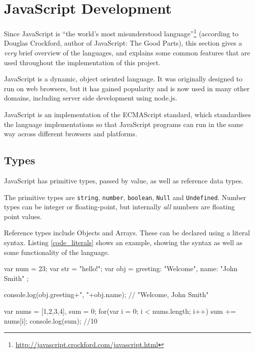 \section{JavaScript Development} %
\label{sec:javascript_development}
Since JavaScript is ``the world's most misunderstood language''\footnote{\url{http://javascript.crockford.com/javascript.html}} (according to Douglas Crockford, author of JavaScript: The Good Parts\cite{crockfordjavascript}), this section gives a \emph{very} brief overview of the languages, and explains some common features that are used throughout the implementation of this project.

JavaScript is a dynamic, object oriented language. It was originally designed to run on web browsers, but it has gained popularity and is now used in many other domains, including server side development using node.js. 

JavaScript is an implementation of the ECMAScript standard, which standardises the language implementations so that JavaScript programs can run in the same way across different browsers and platforms.

\subsection{Types} %
\label{sub:js_types}
JavaScript has primitive types, passed by value, as well as reference data types.

The primitive types are \lstinline+string+, \lstinline+number+, \lstinline+boolean+, \lstinline+Null+ and \lstinline+Undefined+. Number types can be integer or floating-point, but internally \emph{all} numbers are floating point values.

Reference types include Objects and Arrays. These can be declared using a literal syntax. Listing \ref{code_literals} shows an example, showing the syntax as well as some functionality of the language.

\begin{code}
var num = 23;
var str = "hello!";
var obj = {
  greeting: "Welcome",
  name: "John Smith"
};

console.log(obj.greeting+", "+obj.name); // "Welcome, John Smith"

var nums = [1,2,3,4], sum = 0;
for(var i = 0; i < nums.length; i++){
  sum += nums[i];
}
console.log(sum); //10
\end{code}


